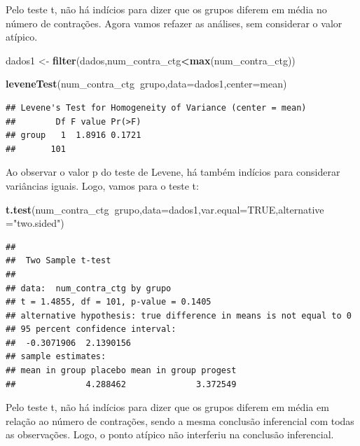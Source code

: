 \documentclass[
]{book}
\newenvironment{Shaded}{\begin{snugshade}}{\end{snugshade}}
\newcommand{\DataTypeTok}[1]{\textcolor[rgb]{0.13,0.29,0.53}{#1}}
\newcommand{\KeywordTok}[1]{\textcolor[rgb]{0.13,0.29,0.53}{\textbf{#1}}}
\newcommand{\NormalTok}[1]{#1}
\newcommand{\OperatorTok}[1]{\textcolor[rgb]{0.81,0.36,0.00}{\textbf{#1}}}
\newcommand{\OtherTok}[1]{\textcolor[rgb]{0.56,0.35,0.01}{#1}}
\newcommand{\StringTok}[1]{\textcolor[rgb]{0.31,0.60,0.02}{#1}}
\begin{document}
Pelo teste t, não há indícios para dizer que os grupos diferem em média no número de contrações. Agora vamos refazer as análises, sem considerar o valor atípico.

\begin{Shaded}
\begin{Highlighting}[]
\NormalTok{dados1 <-}\StringTok{ }\KeywordTok{filter}\NormalTok{(dados,num_contra_ctg}\OperatorTok{<}\KeywordTok{max}\NormalTok{(num_contra_ctg)) }
\end{Highlighting}
\end{Shaded}

\begin{Shaded}
\begin{Highlighting}[]
\KeywordTok{leveneTest}\NormalTok{(num_contra_ctg}\OperatorTok{~}\NormalTok{grupo,}\DataTypeTok{data=}\NormalTok{dados1,}\DataTypeTok{center=}\NormalTok{mean) }
\end{Highlighting}
\end{Shaded}

\begin{verbatim}
## Levene's Test for Homogeneity of Variance (center = mean)
##        Df F value Pr(>F)
## group   1  1.8916 0.1721
##       101
\end{verbatim}

Ao observar o valor p do teste de Levene, há também indícios para considerar variâncias iguais. Logo, vamos para o teste t:

\begin{Shaded}
\begin{Highlighting}[]
\KeywordTok{t.test}\NormalTok{(num_contra_ctg}\OperatorTok{~}\NormalTok{grupo,}\DataTypeTok{data=}\NormalTok{dados1,}\DataTypeTok{var.equal=}\OtherTok{TRUE}\NormalTok{,}\DataTypeTok{alternative =}\StringTok{"two.sided"}\NormalTok{)}
\end{Highlighting}
\end{Shaded}

\begin{verbatim}
## 
## 	Two Sample t-test
## 
## data:  num_contra_ctg by grupo
## t = 1.4855, df = 101, p-value = 0.1405
## alternative hypothesis: true difference in means is not equal to 0
## 95 percent confidence interval:
##  -0.3071906  2.1390156
## sample estimates:
## mean in group placebo mean in group progest 
##              4.288462              3.372549
\end{verbatim}

Pelo teste t, não há indícios para dizer que os grupos diferem em média em relação ao número de contrações, sendo a mesma conclusão inferencial com todas as observações. Logo, o ponto atípico não interferiu na conclusão inferencial.
\end{document}
